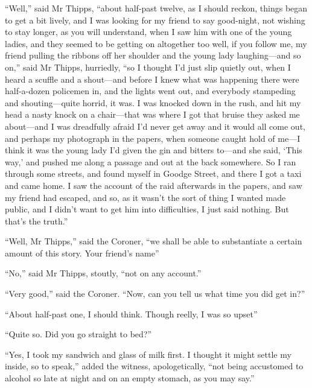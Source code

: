 \enquote{Well,} said Mr Thipps, \enquote{about half-past twelve, as I should reckon, things began to get a bit lively, and I was looking for my friend to say good-night, not wishing to stay longer, as you will understand, when I saw him with one of the young ladies, and they seemed to be getting on altogether too well, if you follow me, my friend pulling the ribbons off her shoulder and the young lady laughing\allowbreak---\allowbreak and so on,} said Mr Thipps, hurriedly, \enquote{so I thought I’d just slip quietly out, when I heard a scuffle and a shout\allowbreak---\allowbreak and before I knew what was happening there were half-a-dozen policemen in, and the lights went out, and everybody stampeding and shouting\allowbreak---\allowbreak quite horrid, it was. I was knocked down in the rush, and hit my head a nasty knock on a chair\allowbreak---\allowbreak that was where I got that bruise they asked me about\allowbreak---\allowbreak and I was dreadfully afraid I’d never get away and it would all come out, and perhaps my photograph in the papers, when someone caught hold of me\allowbreak---\allowbreak I think it was the young lady I’d given the gin and bitters to\allowbreak---\allowbreak and she said, \enquote{This way,} and pushed me along a passage and out at the back somewhere. So I ran through some streets, and found myself in Goodge Street, and there I got a taxi and came home. I saw the account of the raid afterwards in the papers, and saw my friend had escaped, and so, as it wasn’t the sort of thing I wanted made public, and I didn’t want to get him into difficulties, I just said nothing. But that’s the truth.}

\enquote{Well, Mr Thipps,} said the Coroner, \enquote{we shall be able to substantiate a certain amount of this story. Your friend’s name\longdash}

\enquote{No,} said Mr Thipps, stoutly, \enquote{not on any account.}

\enquote{Very good,} said the Coroner. \enquote{Now, can you tell us what time you did get in?}

\enquote{About half-past one, I should think. Though reelly, I was so upset\longdash}

\enquote{Quite so. Did you go straight to bed?}

\enquote{Yes, I took my sandwich and glass of milk first. I thought it might settle my inside, so to speak,} added the witness, apologetically, \enquote{not being accustomed to alcohol so late at night and on an empty stomach, as you may say.}

